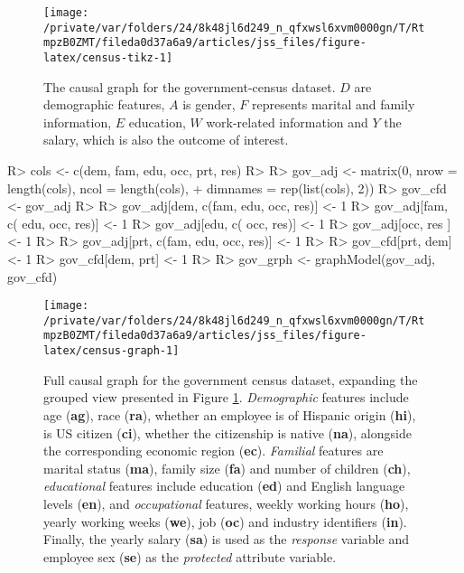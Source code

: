 \documentclass[
  nojss]{jss}
\begin{document}
\begin{CodeChunk}
\begin{figure}

{\centering \texttt{[image: /private/var/folders/24/8k48jl6d249\_n\_qfxwsl6xvm0000gn/T/RtmpzB0ZMT/fileda0d37a6a9/articles/jss\_files/figure-latex/census-tikz-1]} 

}

\caption[The causal graph for the government-census dataset]{The causal graph for the government-census dataset. $D$ are demographic features, $A$ is gender, $F$ represents marital and family information, $E$ education, $W$ work-related information and $Y$ the salary, which is also the outcome of interest.}\label{fig:census-tikz}
\end{figure}
\end{CodeChunk}

\begin{CodeChunk}
\begin{CodeInput}
R> cols <- c(dem, fam, edu, occ, prt, res)
R> 
R> gov_adj <- matrix(0, nrow = length(cols), ncol = length(cols),
+                   dimnames = rep(list(cols), 2))
R> gov_cfd <- gov_adj
R> 
R> gov_adj[dem, c(fam, edu, occ, res)] <- 1
R> gov_adj[fam, c(     edu, occ, res)] <- 1
R> gov_adj[edu, c(          occ, res)] <- 1
R> gov_adj[occ,                  res ] <- 1
R> 
R> gov_adj[prt, c(fam, edu, occ, res)] <- 1
R> 
R> gov_cfd[prt, dem] <- 1
R> gov_cfd[dem, prt] <- 1
R> 
R> gov_grph <- graphModel(gov_adj, gov_cfd)
\end{CodeInput}
\end{CodeChunk}

\begin{CodeChunk}
\begin{figure}

{\centering \texttt{[image: /private/var/folders/24/8k48jl6d249\_n\_qfxwsl6xvm0000gn/T/RtmpzB0ZMT/fileda0d37a6a9/articles/jss\_files/figure-latex/census-graph-1]} 

}

\caption{Full causal graph for the government census dataset, expanding the grouped view presented in Figure \ref{fig:census-tikz}. \textit{Demographic} features include age (\textbf{ag}), race (\textbf{ra}), whether an employee is of Hispanic origin (\textbf{hi}), is US citizen (\textbf{ci}), whether the citizenship is native (\textbf{na}), alongside the corresponding economic region (\textbf{ec}). \textit{Familial} features are marital status (\textbf{ma}), family size (\textbf{fa}) and number of children (\textbf{ch}), \textit{educational} features include education (\textbf{ed}) and English language levels (\textbf{en}), and \textit{occupational} features, weekly working hours (\textbf{ho}), yearly working weeks (\textbf{we}), job (\textbf{oc}) and industry identifiers (\textbf{in}). Finally, the yearly salary (\textbf{sa}) is used as the \textit{response} variable and employee sex (\textbf{se}) as the \textit{protected} attribute variable.}\label{fig:census-graph}
\end{figure}
\end{CodeChunk}
\end{document}

